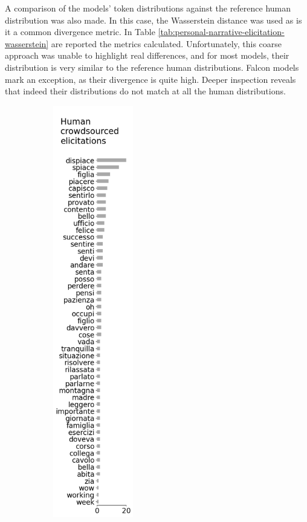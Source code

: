 
A comparison of the models' token distributions against the reference human distribution was also made. In this case, the Wasserstein distance \cite{wasserstein} was used as is it a common divergence metric. In Table \ref{tab:personal-narrative-elicitation-wasserstein} are reported the metrics calculated. Unfortunately, this coarse approach was unable to highlight real differences, and for most models, their distribution is very similar to the reference human distributions. Falcon models mark an exception, as their divergence is quite high. Deeper inspection reveals that indeed their distributions do not match at all the human distributions. 
\begin{figure}[!htbp]
    \centering
    \begin{subfigure}[t]{0.25\textwidth}
        \centering
        \captionsetup{width=.8\linewidth}%
        \includegraphics[height=18cm]{assets/imgs/dataset-test-set-top-50-answers-vertical.png}

\end{subfigure}
\end{figure}
